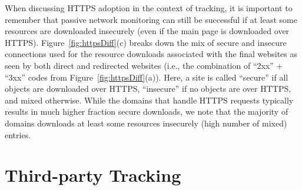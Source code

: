 \documentclass[letterpaper]{sig-alternate-10pt}
\begin{document}
When discussing HTTPS adoption in the context of tracking, 
it is important to remember that passive network monitoring 
can still be successful if at least some resources are 
downloaded insecurely (even if the main page is downloaded over HTTPS).
Figure~\ref{fig:httpsDiff}(c) breaks down the mix of secure and insecure
connections used for the resource downloads associated with the final websites
as seen by both direct and redirected websites
(i.e., the combination of ``2xx'' + ``3xx'' codes from Figure~\ref{fig:httpsDiff}(a)).
Here, a site is called ``secure'' if all objects are downloaded over HTTPS,
``insecure'' if no objects are over HTTPS, and mixed otherwise.
While the domains that handle HTTPS requests 
typically results in much higher fraction secure downloads,
we note that the majority of domains downloads at least 
some resources insecurely (high number of mixed) entries.

%



\section{Third-party Tracking}\label{sec:tracking}
\end{document}
